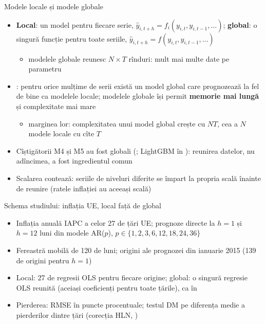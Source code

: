 \begin{frame}{Modele locale și modele globale}
\itemsize{\small}
\begin{itemize}
    \item \textbf{Local}: un model pentru fiecare serie, $\hat y_{i,t+h} = f_i(y_{i,t}, y_{i,t-1},\dots)$; \textbf{global}: o singură funcție pentru toate seriile, $\hat y_{i,t+h} = f(y_{i,t}, y_{i,t-1},\dots)$
    \begin{itemize}
        \item modelele globale reunesc $N \times T$ rînduri: mult mai multe date pe parametru
    \end{itemize}
    \item {}: pentru orice mulțime de serii există un model global care prognozează la fel de bine ca modelele locale; modelele globale își permit \textbf{memorie mai lungă} și complexitate mai mare
    \begin{itemize}
        \item marginea lor: complexitatea unui model global crește cu $NT$, cea a $N$ modele locale cu cîte $T$
    \end{itemize}
    \item Cîștigătorii M4 și M5 au fost globali (; LightGBM în ): reunirea datelor, nu adîncimea, a fost ingredientul comun
    \item Scalarea contează: seriile de niveluri diferite se împart la propria scală înainte de reunire (ratele inflației au aceeași scală)
\end{itemize}
\end{frame}

\begin{frame}{Schema studiului: inflația UE, local față de global}
\itemsize{\small}
\begin{itemize}
    \item Inflația anuală IAPC a celor 27 de țări UE; prognoze directe la $h = 1$ și $h = 12$ luni din modele AR($p$), $p \in \{1, 2, 3, 6, 12, 18, 24, 36\}$
    \item Fereastră mobilă de 120 de luni; origini ale prognozei din ianuarie 2015 (139 de origini pentru $h = 1$)
    \item Local: 27 de regresii OLS pentru fiecare origine; global: o singură regresie OLS reunită (aceiași coeficienți pentru toate țările), ca în 
    \item Pierderea: RMSE în puncte procentuale; testul DM pe diferența medie a pierderilor dintre țări (corecția HLN, )
\end{itemize}
\end{frame}

